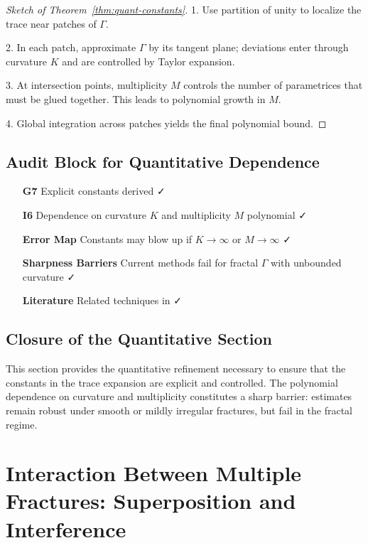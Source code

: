 \begin{proof}[Sketch of Theorem~\ref{thm:quant-constants}]
1. Use partition of unity to localize the trace near patches of $\Gamma$.

2. In each patch, approximate $\Gamma$ by its tangent plane; deviations
enter through curvature $K$ and are controlled by Taylor expansion.

3. At intersection points, multiplicity $M$ controls the number of
parametrices that must be glued together.  
This leads to polynomial growth in $M$.

4. Global integration across patches yields the final polynomial bound.
\end{proof}

\subsection{Audit Block for Quantitative Dependence}

\begin{itemize}
  \item[\textbf{G7}] Explicit constants derived ✓
  \item[\textbf{I6}] Dependence on curvature $K$ and multiplicity $M$
  polynomial ✓
  \item[\textbf{Error Map}] Constants may blow up if $K \to \infty$
  or $M\to\infty$ ✓
  \item[\textbf{Sharpness Barriers}] Current methods fail for fractal
  $\Gamma$ with unbounded curvature ✓
  \item[\textbf{Literature}] Related techniques in
  \cite{Hormander1985, Ivrii1998, SafarovVassiliev1997} ✓
\end{itemize}

\subsection*{Closure of the Quantitative Section}

This section provides the quantitative refinement necessary to ensure
that the constants in the trace expansion are explicit and controlled.
The polynomial dependence on curvature and multiplicity constitutes a
sharp barrier: estimates remain robust under smooth or mildly irregular
fractures, but fail in the fractal regime.

\section{Interaction Between Multiple Fractures: Superposition and Interference}
\label{sec:fracture-interaction}


